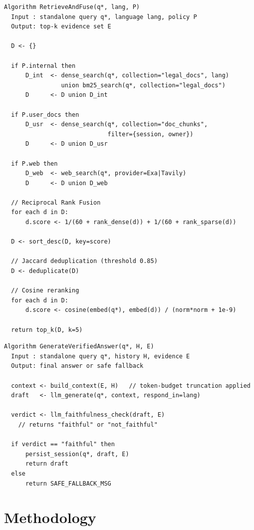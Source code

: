 \documentclass[12pt, a4paper]{article}
\begin{document}
\begin{lstlisting}[caption={Stage 3 --- Multi-source retrieval, fusion, and reranking.},
                   label={lst:retrieval}, language={}]
Algorithm RetrieveAndFuse(q*, lang, P)
  Input : standalone query q*, language lang, policy P
  Output: top-k evidence set E

  D <- {}

  if P.internal then
      D_int  <- dense_search(q*, collection="legal_docs", lang)
                union bm25_search(q*, collection="legal_docs")
      D      <- D union D_int

  if P.user_docs then
      D_usr  <- dense_search(q*, collection="doc_chunks",
                             filter={session, owner})
      D      <- D union D_usr

  if P.web then
      D_web  <- web_search(q*, provider=Exa|Tavily)
      D      <- D union D_web

  // Reciprocal Rank Fusion
  for each d in D:
      d.score <- 1/(60 + rank_dense(d)) + 1/(60 + rank_sparse(d))

  D <- sort_desc(D, key=score)

  // Jaccard deduplication (threshold 0.85)
  D <- deduplicate(D)

  // Cosine reranking
  for each d in D:
      d.score <- cosine(embed(q*), embed(d)) / (norm*norm + 1e-9)

  return top_k(D, k=5)
\end{lstlisting}

\begin{lstlisting}[caption={Stage 4 --- Verified answer generation.},
                   label={lst:gen}, language={}]
Algorithm GenerateVerifiedAnswer(q*, H, E)
  Input : standalone query q*, history H, evidence E
  Output: final answer or safe fallback

  context <- build_context(E, H)   // token-budget truncation applied
  draft   <- llm_generate(q*, context, respond_in=lang)

  verdict <- llm_faithfulness_check(draft, E)
    // returns "faithful" or "not_faithful"

  if verdict == "faithful" then
      persist_session(q*, draft, E)
      return draft
  else
      return SAFE_FALLBACK_MSG
\end{lstlisting}

\section{Methodology}
\end{document}

